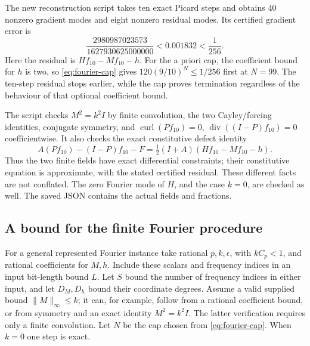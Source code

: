 \documentclass[11pt,a4paper]{article}
\numberwithin{equation}{section}
\theoremstyle{definition}
\theoremstyle{remark}\newtheorem{remark}[theorem]{Remark}
\DeclareMathOperator{\diver}{div}
\DeclareMathOperator{\curl}{curl}
\newcommand{\Id}{I}
\newcommand{\norm}[1]{\lVert #1\rVert}
\begin{document}
The new reconstruction script takes ten exact Picard steps and obtains
40 nonzero gradient modes and eight nonzero residual modes.
Its certified gradient error is
\begin{equation}\label{eq:exact-fourier-error}
 \frac{2980987023573}{1627930625000000}
 <0.001832<\frac1{256}.
\end{equation}
Here the residual is \(Hf_{10}-Mf_{10}-h\).
For the a priori cap, the coefficient bound for \(h\) is two, so
\eqref{eq:fourier-cap} gives
\(120(9/10)^N\leq1/256\) first at \(N=99\).
The ten-step residual stops earlier, while the cap proves termination
regardless of the behaviour of that optional coefficient bound.

The script checks \(M^2=k^2\Id\) by finite convolution,
the two Cayley/forcing identities, conjugate symmetry, and
\(\curl(Pf_{10})=0\), \(\diver((\Id-P)f_{10})=0\) coefficientwise.
It also checks the exact constitutive defect identity
\[
 A(Pf_{10})-(\Id-P)f_{10}-F
   =\tfrac12(\Id+A)(Hf_{10}-Mf_{10}-h).
\]
Thus the two finite fields have exact differential constraints;
their constitutive equation is approximate, with the stated
certified residual. These different facts are not conflated.
The zero Fourier mode of \(H\), and the case \(k=0\), are checked as well.
The saved JSON contains the actual fields and fractions.

\subsection{A bound for the finite Fourier procedure}

For a general represented Fourier instance take rational
\(p,k,\epsilon\), with \(kC_p<1\), and rational coefficients for
\(M,h\). Include these scalars and frequency indices in an input
bit-length bound \(L\). Let \(S\) bound the number of frequency
indices in either input, and let \(D_M,D_h\) bound their coordinate
degrees. Assume a valid supplied bound \(\norm M_\infty\leq k\);
it can, for example, follow from a rational coefficient bound, or
from symmetry and an exact identity \(M^2=k^2\Id\).
The latter verification requires only a finite convolution.
Let \(N\) be the cap chosen from \eqref{eq:fourier-cap}.
When \(k=0\) one step is exact.
\end{document}
